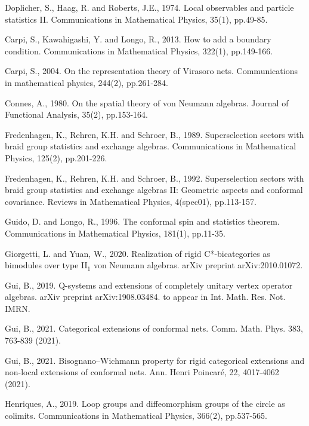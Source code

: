 \documentclass[12pt,a4paper,notitlepage]{article}
\theoremstyle{definition}
\theoremstyle{plain}
\numberwithin{equation}{section}
\begin{document}
\begin{thebibliography}{999999}
Doplicher, S., Haag, R. and Roberts, J.E., 1974. Local observables and particle statistics II. Communications in Mathematical Physics, 35(1), pp.49-85.

Carpi, S., Kawahigashi, Y. and Longo, R., 2013. How to add a boundary condition. Communications in Mathematical Physics, 322(1), pp.149-166.

Carpi, S., 2004. On the representation theory of Virasoro nets. Communications in mathematical physics, 244(2), pp.261-284.

Connes, A., 1980. On the spatial theory of von Neumann algebras. Journal of Functional Analysis, 35(2), pp.153-164.

Fredenhagen, K., Rehren, K.H. and Schroer, B., 1989. Superselection sectors with braid group statistics and exchange algebras. Communications in Mathematical Physics, 125(2), pp.201-226.

Fredenhagen, K., Rehren, K.H. and Schroer, B., 1992. Superselection sectors with braid group statistics and exchange algebras II: Geometric aspects and conformal covariance. Reviews in Mathematical Physics, 4(spec01), pp.113-157.

Guido, D. and Longo, R., 1996. The conformal spin and statistics theorem. Communications in Mathematical Physics, 181(1), pp.11-35.

Giorgetti, L. and Yuan, W., 2020. Realization of rigid C*-bicategories as bimodules over type II$_1 $ von Neumann algebras. arXiv preprint arXiv:2010.01072.


Gui, B., 2019. Q-systems and extensions of completely unitary vertex operator algebras. arXiv preprint arXiv:1908.03484. to appear in Int. Math. Res. Not. IMRN.

Gui, B., 2021. Categorical extensions of conformal nets. Comm. Math. Phys. 383, 763-839 (2021).

Gui, B., 2021. Bisognano–Wichmann property for rigid categorical extensions and non-local extensions of conformal nets. Ann. Henri Poincaré, 22, 4017-4062 (2021).




Henriques, A., 2019. Loop groups and diffeomorphism groups of the circle as colimits. Communications in Mathematical Physics, 366(2), pp.537-565.


\end{thebibliography}
\end{document}
